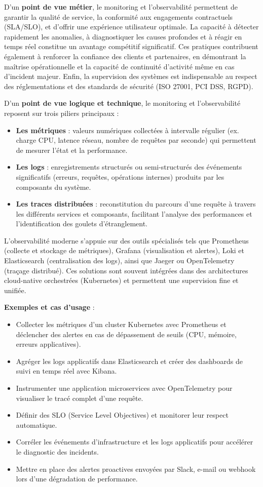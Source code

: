 D’un \textbf{point de vue métier}, le monitoring et l’observabilité permettent de garantir la qualité de service, la conformité aux engagements contractuels (SLA/SLO), et d’offrir une expérience utilisateur optimale. La capacité à détecter rapidement les anomalies, à diagnostiquer les causes profondes et à réagir en temps réel constitue un avantage compétitif significatif. Ces pratiques contribuent également à renforcer la confiance des clients et partenaires, en démontrant la maîtrise opérationnelle et la capacité de continuité d’activité même en cas d’incident majeur. Enfin, la supervision des systèmes est indispensable au respect des réglementations et des standards de sécurité (ISO 27001, PCI DSS, RGPD).

D’un \textbf{point de vue logique et technique}, le monitoring et l’observabilité reposent sur trois piliers principaux :
\begin{itemize}
	\item \textbf{Les métriques} : valeurs numériques collectées à intervalle régulier (ex. charge CPU, latence réseau, nombre de requêtes par seconde) qui permettent de mesurer l’état et la performance.
	\item \textbf{Les logs} : enregistrements structurés ou semi-structurés des événements significatifs (erreurs, requêtes, opérations internes) produits par les composants du système.
	\item \textbf{Les traces distribuées} : reconstitution du parcours d’une requête à travers les différents services et composants, facilitant l’analyse des performances et l’identification des goulets d’étranglement.
\end{itemize}

L’observabilité moderne s’appuie sur des outils spécialisés tels que Prometheus (collecte et stockage de métriques), Grafana (visualisation et alertes), Loki et Elasticsearch (centralisation des logs), ainsi que Jaeger ou OpenTelemetry (traçage distribué). Ces solutions sont souvent intégrées dans des architectures cloud-native orchestrées (Kubernetes) et permettent une supervision fine et unifiée.

\textbf{Exemples et cas d’usage} :
\begin{itemize}
	\item Collecter les métriques d’un cluster Kubernetes avec Prometheus et déclencher des alertes en cas de dépassement de seuils (CPU, mémoire, erreurs applicatives).
	\item Agréger les logs applicatifs dans Elasticsearch et créer des dashboards de suivi en temps réel avec Kibana.
	\item Instrumenter une application microservices avec OpenTelemetry pour visualiser le tracé complet d’une requête.
	\item Définir des SLO (Service Level Objectives) et monitorer leur respect automatique.
	\item Corréler les événements d’infrastructure et les logs applicatifs pour accélérer le diagnostic des incidents.
	\item Mettre en place des alertes proactives envoyées par Slack, e-mail ou webhook lors d’une dégradation de performance.
\end{itemize}

